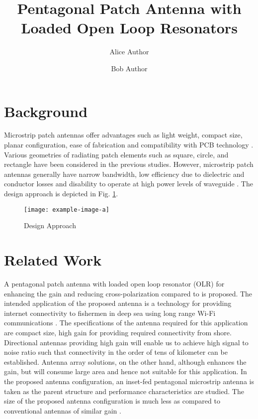 \documentclass[fleqn,10pt]{wlscirep}
\title{Pentagonal Patch Antenna with Loaded Open Loop Resonators}
\author[1,*]{Alice Author}
\author[2]{Bob Author}
\affil[1]{Affiliation, department, city, postcode, country}
\affil[2]{Affiliation, department, city, postcode, country}
\begin{document}
\flushbottom
\maketitle
%
%
\thispagestyle{empty}


\section*{Background}
\label{sec:background}
Microstrip patch antennas offer advantages such as light weight, compact size, planar configuration,  ease of fabrication and compatibility with PCB technology \cite{iftissane2011conception}. Various geometries of radiating patch elements such as square, circle, and rectangle have been considered in the previous studies\cite{gupta2013circularly}. However,  microstrip patch antennas generally have narrow bandwidth, low efficiency  due to dielectric and conductor losses and disability to operate at high power levels of waveguide \cite{zhang2016design}\cite{harish20153}\cite{vaishnavi2014simulation}\cite{anand2015analysis}.  The design approach is depicted in Fig. \ref{fig:design}.

\begin{figure} [h]
 \begin{center}

\label{fig:design}
 \texttt{[image: example-image-a]}
 \caption{Design Approach}
 \label{fig:design}
 \end{center}
\end{figure}


\section*{Related Work}
\label{sec:relatedwork}
A pentagonal patch antenna with loaded open loop resonator (OLR) for enhancing the gain and reducing cross-polarization compared to \cite{lafmajani2011miniaturized}\cite{gupta2019design} is proposed. The intended application of the proposed antenna is a technology for providing internet connectivity to fishermen in deep sea using long range Wi-Fi communications \cite{rao2016realizing}\cite{jayakrishnan2018effect}. The specifications of the antenna required for this application are compact size, high gain for providing required connectivity from shore. Directional antennas providing high gain will enable us to achieve high signal to noise ratio such that connectivity in the order of tens of kilometer can be established. Antenna array solutions, on the other hand, although enhances the gain, but will consume large area and hence not suitable for this application. In the proposed antenna configuration, an inset-fed pentagonal microstrip antenna is taken as the parent structure and performance characteristics are studied. The size of the proposed antenna configuration is much less as compared to conventional antennas of similar gain \cite{joshi2011metamaterial}.


% 

\end{document}
